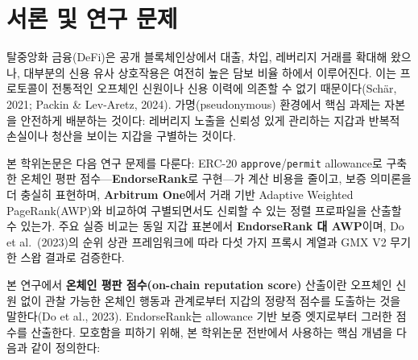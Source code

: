 \chapter{서론 및 연구 문제}
\label{ch:introduction}

탈중앙화 금융(DeFi)은 공개 블록체인상에서 대출, 차입, 레버리지 거래를 확대해 왔으나, 대부분의 신용 유사 상호작용은 여전히 높은 담보 비율 하에서 이루어진다. 이는 프로토콜이 전통적인 오프체인 신원이나 신용 이력에 의존할 수 없기 때문이다(Sch\"{a}r, 2021; Packin \& Lev-Aretz, 2024). 가명(pseudonymous) 환경에서 핵심 과제는 자본을 안전하게 배분하는 것이다: 레버리지 노출을 신뢰성 있게 관리하는 지갑과 반복적 손실이나 청산을 보이는 지갑을 구별하는 것이다.

본 학위논문은 다음 연구 문제를 다룬다: ERC-20 \texttt{approve}/\texttt{permit} allowance로 구축한 온체인 평판 점수---\textbf{EndorseRank}로 구현---가 계산 비용을 줄이고, 보증 의미론을 더 충실히 표현하며, \textbf{Arbitrum One}에서 거래 기반 Adaptive Weighted PageRank(AWP)와 비교하여 구별되면서도 신뢰할 수 있는 정렬 프로파일을 산출할 수 있는가. 주요 실증 비교는 동일 지갑 표본에서 \textbf{EndorseRank 대 AWP}이며, Do et al.\ (2023)의 순위 상관 프레임워크에 따라 다섯 가지 프록시 계열과 GMX V2 무기한 스왑 결과로 검증한다.

본 연구에서 \textbf{온체인 평판 점수(on-chain reputation score)} 산출이란 오프체인 신원 없이 관찰 가능한 온체인 행동과 관계로부터 지갑의 정량적 점수를 도출하는 것을 말한다(Do et al., 2023). EndorseRank는 allowance 기반 보증 엣지로부터 그러한 점수를 산출한다. 모호함을 피하기 위해, 본 학위논문 전반에서 사용하는 핵심 개념을 다음과 같이 정의한다:

